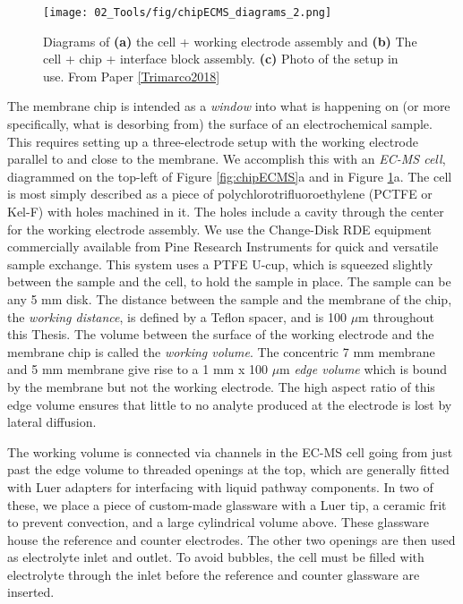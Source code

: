 \begin{figure}[h!]
	\centering
	\texttt{[image: 02\_Tools/fig/chipECMS\_diagrams\_2.png]}
	\caption{Diagrams of \textbf{(a)} the cell + working electrode assembly and \textbf{(b)} The cell + chip + interface block assembly. \textbf{(c)} Photo of the setup in use. From Paper \ref{Trimarco2018}}
	\label{fig:chipECMS2}
\end{figure}

The membrane chip is intended as a \textit{window} into what is happening on (or more specifically, what is desorbing from) the surface of an electrochemical sample. This requires setting up a three-electrode setup with the working electrode parallel to and close to the membrane. We accomplish this with an \textit{EC-MS cell}, diagrammed on the top-left of Figure \ref{fig:chipECMS}a and in Figure \ref{fig:chipECMS2}a. The cell is most simply described as a piece of polychlorotrifluoroethylene (PCTFE or Kel-F) with holes machined in it. The holes include a cavity through the center for the working electrode assembly. We use the Change-Disk RDE equipment commercially available from Pine Research Instruments for quick and versatile sample exchange. This system uses a PTFE U-cup, which is squeezed slightly between the sample and the cell, to hold the sample in place. The sample can be any 5 mm disk. The distance between the sample and the membrane of the chip, the \textit{working distance}, is defined by a Teflon spacer, and is 100 $\mu$m throughout this Thesis. The volume between the surface of the working electrode and the membrane chip is called the \textit{working volume}. The concentric 7 mm membrane and 5 mm membrane give rise to a 1 mm x 100 $\mu$m \textit{edge volume} which is bound by the membrane but not the working electrode. The high aspect ratio of this edge volume ensures that little to no analyte produced at the electrode is lost by lateral diffusion. 

The working volume is connected via channels in the EC-MS cell going from just past the edge volume to threaded openings at the top, which are generally fitted with Luer adapters for interfacing with liquid pathway components. In two of these, we place a piece of custom-made glassware with a Luer tip, a ceramic frit to prevent convection, and a large cylindrical volume above. These glassware house the reference and counter electrodes. The other two openings are then used as electrolyte inlet and outlet. To avoid bubbles, the cell must be filled with electrolyte through the inlet before the reference and counter glassware are inserted.

